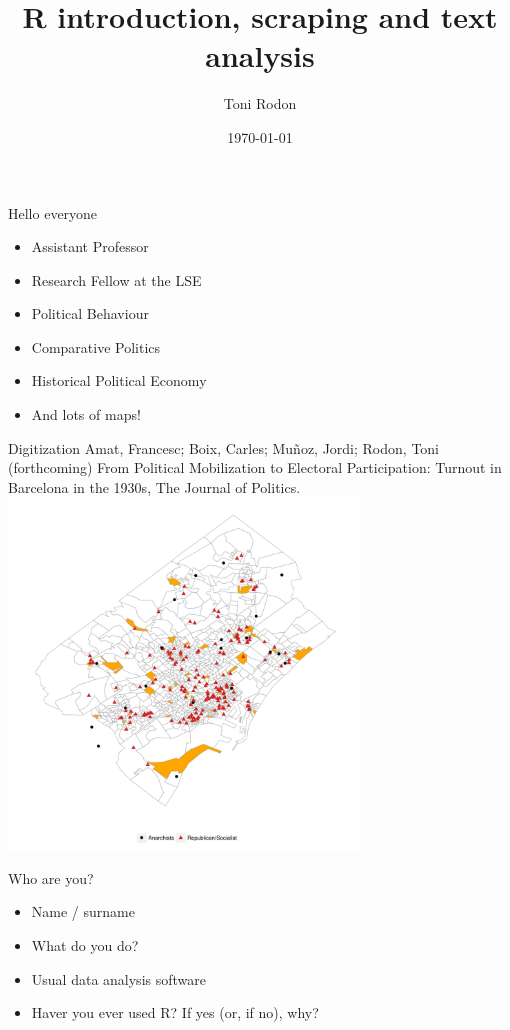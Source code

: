 \documentclass{beamer}
\title{R introduction, scraping and text analysis}
\date{\today}
\author{Toni Rodon}
\institute{Universitat de Barcelona  \\ \faGlobe  \url{www.tonirodon.cat} \\ \faTwitter \href{https://twitter.com/tonirodon}{@tonirodon} }
\begin{document}
  \maketitle


\begin{frame}{Hello everyone}
\begin{itemize}[<+->]
\item Assistant Professor
\item Research Fellow at the LSE
\item Political Behaviour
\item Comparative Politics
\item Historical Political Economy
\item And lots of maps!
 \end{itemize} 
\end{frame}



 \begin{frame}{Digitization}
  \tiny Amat, Francesc; Boix, Carles; Muñoz, Jordi; Rodon, Toni (forthcoming) From Political Mobilization to Electoral Participation: Turnout in Barcelona in the 1930s, The Journal of Politics. 
  \centering
 \includegraphics[width=0.7\textwidth]{../Figures/bcn_jop.pdf}
 \end{frame}


\begin{frame}{Who are you?}
\begin{itemize}
\item Name / surname
\item What do you do?
\item Usual data analysis software
\item Haver you ever used R? If yes (or, if no), why? 
 \end{itemize} 
\end{frame}
\end{document}
